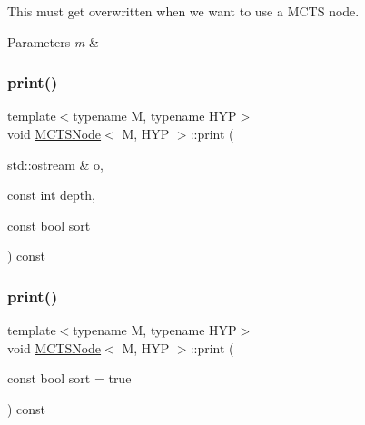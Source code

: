 This must get overwritten when we want to use a M\+C\+TS node. 


\begin{DoxyParams}{Parameters}
{\em m} & \\
\hline
\end{DoxyParams}
\mbox{\label{class_m_c_t_s_node_ab4d95f5a7a753b39d30771b4e385a934}} 
\subsubsection{\texorpdfstring{print()}{print()}\hspace{0.1cm}{\footnotesize\ttfamily [1/3]}}
{\footnotesize\ttfamily template$<$typename M, typename H\+YP$>$ \\
void \hyperlink{class_m_c_t_s_node}{M\+C\+T\+S\+Node}$<$ M, H\+YP $>$\+::print (\begin{DoxyParamCaption}\item[{std\+::ostream \&}]{o,  }\item[{const int}]{depth,  }\item[{const bool}]{sort }\end{DoxyParamCaption}) const\hspace{0.3cm}{\ttfamily [inline]}}

\mbox{\label{class_m_c_t_s_node_ad82ca09e761b18033a2418c3f564151f}} 
\subsubsection{\texorpdfstring{print()}{print()}\hspace{0.1cm}{\footnotesize\ttfamily [2/3]}}
{\footnotesize\ttfamily template$<$typename M, typename H\+YP$>$ \\
void \hyperlink{class_m_c_t_s_node}{M\+C\+T\+S\+Node}$<$ M, H\+YP $>$\+::print (\begin{DoxyParamCaption}\item[{const bool}]{sort = {\ttfamily true} }\end{DoxyParamCaption}) const\hspace{0.3cm}{\ttfamily [inline]}}

\mbox{\label{class_m_c_t_s_node_ae0d17485c455b8d7e4fa9ee1a179d631}} 
